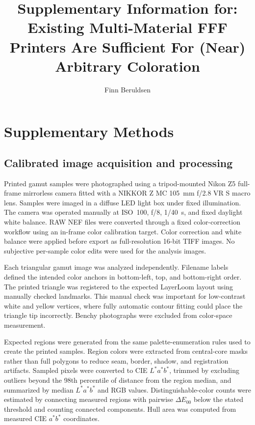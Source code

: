 \documentclass[preprint,12pt,authoryear]{elsarticle}
\begin{document}
\begin{frontmatter}

\title{Supplementary Information for: Existing Multi-Material FFF Printers Are Sufficient For (Near) Arbitrary Coloration}

\author[uh]{Finn Beruldsen}


\end{frontmatter}

\section*{Supplementary Methods}

\subsection*{Calibrated image acquisition and processing}

Printed gamut samples were photographed using a tripod-mounted Nikon Z5 full-frame mirrorless camera fitted with a NIKKOR Z MC 105~mm f/2.8 VR S macro lens. Samples were imaged in a diffuse LED light box under fixed illumination. The camera was operated manually at ISO~100, f/8, 1/40~s, and fixed daylight white balance. RAW NEF files were converted through a fixed color-correction workflow using an in-frame color calibration target. Color correction and white balance were applied before export as full-resolution 16-bit TIFF images. No subjective per-sample color edits were used for the analysis images.

Each triangular gamut image was analyzed independently. Filename labels defined the intended color anchors in bottom-left, top, and bottom-right order. The printed triangle was registered to the expected LayerLoom layout using manually checked landmarks. This manual check was important for low-contrast white and yellow vertices, where fully automatic contour fitting could place the triangle tip incorrectly. Benchy photographs were excluded from color-space measurement.

Expected regions were generated from the same palette-enumeration rules used to create the printed samples. Region colors were extracted from central-core masks rather than full polygons to reduce seam, border, shadow, and registration artifacts. Sampled pixels were converted to CIE \(L^*a^*b^*\), trimmed by excluding outliers beyond the 98th percentile of distance from the region median, and summarized by median \(L^*a^*b^*\) and RGB values. Distinguishable-color counts were estimated by connecting measured regions with pairwise \(\Delta E_{00}\) below the stated threshold and counting connected components. Hull area was computed from measured CIE \(a^*b^*\) coordinates.
\end{document}

